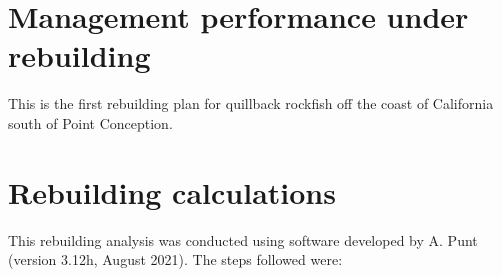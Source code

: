 \documentclass[11pt,
  english,
  a4paper,
]{article}
\begin{document}
\leavevmode\tagmcend\tagstructend\par

\clearpage


\hypertarget{management-performance-under-rebuilding}{%
\section{Management performance under rebuilding}\label{management-performance-under-rebuilding}}

\leavevmode\tagmcend\tagstructend


This is the first rebuilding plan for quillback rockfish off the coast of California south of Point Conception.

\leavevmode\tagmcend\tagstructend\par


\hypertarget{rebuilding-calculations}{%
\section{Rebuilding calculations}\label{rebuilding-calculations}}

\leavevmode\tagmcend\tagstructend


This rebuilding analysis was conducted using software developed by A. Punt (version 3.12h, August 2021). The steps followed were:

\leavevmode\tagmcend\tagstructend\par
\end{document}
